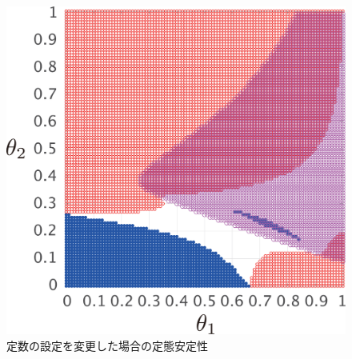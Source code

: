\documentclass[tombow,dvipdfmx]{corona-a5-1.1}
\begin{document}
\begin{figure}[t]
{\begin{minipage}{0.32\linewidth}
    \centering
    \includegraphics[width = .85\linewidth]{figs/gam5ex}
  \end{minipage}
  \caption{定数の設定を変更した場合の定態安定性}
  \label{fig:gamex}
  }
\end{figure}
\end{document}
